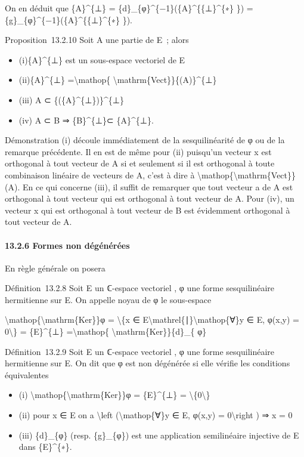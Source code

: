 \documentclass[]{article}
\begin{document}
On en déduit que \{A\}\^{}\{⊥\} =
\{d\}\_\{φ\}\^{}\{−1\}(\{A\}\^{}\{\{⊥\}\^{}\{∗\} \}) =
\{g\}\_\{φ\}\^{}\{−1\}(\{A\}\^{}\{\{⊥\}\^{}\{∗\} \}).

Proposition~13.2.10 Soit A une partie de E~; alors

\begin{itemize}
\itemsep1pt\parskip0pt
\item
  (i)\{A\}\^{}\{⊥\} est un sous-espace vectoriel de E
\item
  (ii)\{A\}\^{}\{⊥\} =\textbackslash{}mathop\{
  \textbackslash{}mathrm\{Vect\}\}\{(A)\}\^{}\{⊥\}
\item
  (iii) A ⊂ \{(\{A\}\^{}\{⊥\})\}\^{}\{⊥\}
\item
  (iv) A ⊂ B ⇒ \{B\}\^{}\{⊥\}⊂ \{A\}\^{}\{⊥\}.
\end{itemize}

Démonstration (i) découle immédiatement de la sesquilinéarité de φ ou de
la remarque précédente. Il en est de même pour (ii) puisqu'un vecteur x
est orthogonal à tout vecteur de A si et seulement si il est orthogonal
à toute combinaison linéaire de vecteurs de A, c'est à dire à
\textbackslash{}mathop\{\textbackslash{}mathrm\{Vect\}\}(A). En ce qui
concerne (iii), il suffit de remarquer que tout vecteur a de A est
orthogonal à tout vecteur qui est orthogonal à tout vecteur de A. Pour
(iv), un vecteur x qui est orthogonal à tout vecteur de B est évidemment
orthogonal à tout vecteur de A.

\paragraph{13.2.6 Formes non dégénérées}

En règle générale on posera

Définition~13.2.8 Soit E un ℂ-espace vectoriel , φ une forme
sesquilinéaire hermitienne sur E. On appelle noyau de φ le sous-espace

\textbackslash{}mathop\{\textbackslash{}mathrm\{Ker\}\}φ =
\textbackslash{}\{x ∈
E\textbackslash{}mathrel\{∣\}\textbackslash{}mathop\{∀\}y ∈ E, φ(x,y) =
0\textbackslash{}\} = \{E\}\^{}\{⊥\} =\textbackslash{}mathop\{
\textbackslash{}mathrm\{Ker\}\}\{d\}\_\{ φ\}

Définition~13.2.9 Soit E un ℂ-espace vectoriel , φ une forme
sesquilinéaire hermitienne sur E. On dit que φ est non dégénérée si elle
vérifie les conditions équivalentes

\begin{itemize}
\itemsep1pt\parskip0pt
\item
  (i) \textbackslash{}mathop\{\textbackslash{}mathrm\{Ker\}\}φ =
  \{E\}\^{}\{⊥\} = \textbackslash{}\{0\textbackslash{}\}
\item
  (ii) pour x ∈ E on a \textbackslash{}left
  (\textbackslash{}mathop\{∀\}y ∈ E, φ(x,y) = 0\textbackslash{}right ) ⇒
  x = 0
\item
  (iii) \{d\}\_\{φ\} (resp. \{g\}\_\{φ\}) est une application
  semilinéaire injective de E dans \{E\}\^{}\{∗\}.
\end{itemize}
\end{document}

